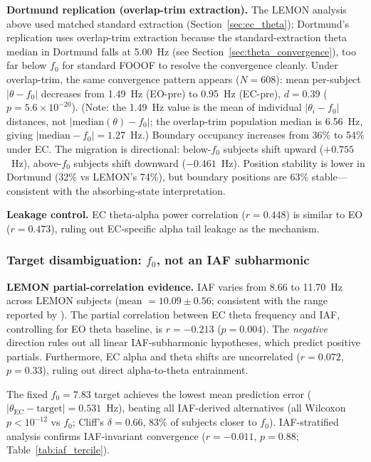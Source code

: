 \documentclass[11pt,a4paper]{article}
\newcommand{\fzero}{f_0}
\begin{document}
\textbf{Dortmund replication (overlap-trim extraction).} The LEMON analysis above used matched standard extraction (Section~\ref{sec:ec_theta}); Dortmund's replication uses overlap-trim extraction because the standard-extraction theta median in Dortmund falls at 5.00~Hz (see Section~\ref{sec:theta_convergence}), too far below $\fzero$ for standard FOOOF to resolve the convergence cleanly. Under overlap-trim, the same convergence pattern appears ($N = 608$): mean per-subject $|\theta - \fzero|$ decreases from 1.49~Hz (EO-pre) to 0.95~Hz (EC-pre), $d = 0.39$ ($p = 5.6 \times 10^{-20}$). (Note: the 1.49~Hz value is the mean of individual $|\theta_i - \fzero|$ distances, not $|\text{median}(\theta) - \fzero|$; the overlap-trim population median is 6.56~Hz, giving $|\text{median} - \fzero| = 1.27$~Hz.) Boundary occupancy increases from 36\% to 54\% under EC. The migration is directional: below-$\fzero$ subjects shift upward ($+0.755$~Hz), above-$\fzero$ subjects shift downward ($-0.461$~Hz). Position stability is lower in Dortmund (32\% vs LEMON's 74\%), but boundary positions are 63\% stable---consistent with the absorbing-state interpretation.

\textbf{Leakage control.} EC theta-alpha power correlation ($r = 0.448$) is similar to EO ($r = 0.473$), ruling out EC-specific alpha tail leakage as the mechanism.

\subsubsection{Target disambiguation: $\fzero$, not an IAF subharmonic}
\label{sec:disambiguation}

\textbf{LEMON partial-correlation evidence.} IAF varies from 8.66 to 11.70~Hz across LEMON subjects (mean $= 10.09 \pm 0.56$; consistent with the range reported by \cite{Haegens2014}). The partial correlation between EC theta frequency and IAF, controlling for EO theta baseline, is $r = -0.213$ ($p = 0.004$). The \textit{negative} direction rules out all linear IAF-subharmonic hypotheses, which predict positive partials. Furthermore, EC alpha and theta shifts are uncorrelated ($r = 0.072$, $p = 0.33$), ruling out direct alpha-to-theta entrainment.

The fixed $\fzero = 7.83$ target achieves the lowest mean prediction error ($|\theta_{\text{EC}} - \text{target}| = 0.531$~Hz), beating all IAF-derived alternatives (all Wilcoxon $p < 10^{-12}$ vs $\fzero$; Cliff's $\delta = 0.66$, 83\% of subjects closer to $\fzero$). IAF-stratified analysis confirms IAF-invariant convergence ($r = -0.011$, $p = 0.88$; Table~\ref{tab:iaf_tercile}).
\end{document}
